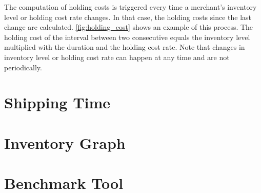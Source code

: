 The computation of holding costs is triggered every time a merchant's inventory level or holding cost rate changes.
In that case, the holding costs since the last change are calculated.
\cref{fig:holding_cost} shows an example of this process.
The holding cost of the interval between two consecutive equals the inventory level multiplied with the duration and the holding cost rate. 
Note that changes in inventory level or holding cost rate can happen at any time and are not periodically.

\section{Shipping Time}
\label{section:shipping_time}

\section{Inventory Graph}
\label{section:inventory_graph}

\section{Benchmark Tool}
\label{section:benchmark_tool}

